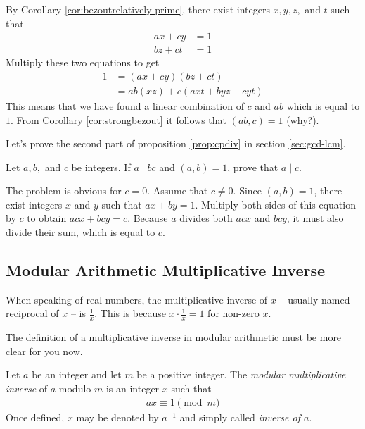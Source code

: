 \begin{solution}
	By Corollary \ref{cor:bezoutrelatively prime}, there exist integers $x,y,z,$ and $t$ such that
		\begin{align*}
			ax+cy&=1\\
			bz+ct&=1
		\end{align*}
	Multiply these two equations to get
		\begin{align*}
			1 &= (ax+cy)(bz+ct)\\
	  &= ab(xz)+c(axt+byz+cyt)
		\end{align*}
	This means that we have found a linear combination of $c$ and $ab$ which is equal to $1$. From Corollary \ref{cor:strongbezout} it follows that $(ab,c)=1$ (why?).
\end{solution}

Let's prove the second part of proposition \eqref{prop:cpdiv} in section \eqref{sec:gcd-lcm}.

\begin{problem}\label{prob:a|bc}
	Let $a,b,$ and $c$ be integers. If $a\mid bc$ and $(a,b)=1$, prove that $a\mid c$.
\end{problem}

\begin{solution}
	The problem is obvious for $c=0$. Assume that $c \neq 0$. Since $(a,b)=1$, there exist integers $x$ and $y$ such that $ax+by=1$. Multiply both sides of this equation by $c$ to obtain $acx+bcy=c$. Because $a$ divides both $acx$ and $bcy$, it must also divide their sum, which is equal to $c$.

\end{solution}

\subsection{Modular Arithmetic Multiplicative Inverse}\label{sec:arithinverse}

When speaking of real numbers, the multiplicative inverse of $x$ -- usually named reciprocal of $x$ -- is $\frac{1}{x}$. This is because $x \cdot \frac{1}{x} = 1$ for non-zero $x$.

The definition of a multiplicative inverse in modular arithmetic must be more clear for you now.

\begin{definition}
	Let $a$ be an integer and let $m$ be a positive integer. The \textit{modular multiplicative inverse} of $a$ modulo $m$ is an integer $x$ such that
	\begin{align*}
	ax \equiv 1 \pmod m
	\end{align*}
	Once defined, $x$ may be denoted by $a^{-1}$ and simply called \textit{inverse of $a$}.
\end{definition}

